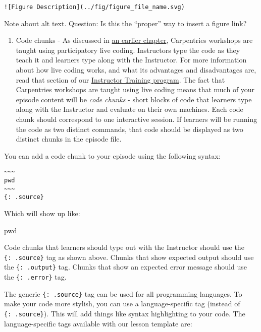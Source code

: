 \documentclass[
]{book}
\newenvironment{Shaded}{\begin{snugshade}}{\end{snugshade}}
\newcommand{\BuiltInTok}[1]{#1}
\providecommand{\tightlist}{%
  \setlength{\itemsep}{0pt}\setlength{\parskip}{0pt}}
\begin{document}
\begin{verbatim}
![Figure Description](../fig/figure_file_name.svg)
\end{verbatim}

Note about alt text. Question: Is this the ``proper'' way to insert a figure link?

\begin{enumerate}
\def\labelenumi{\arabic{enumi}.}
\tightlist
\item
  Code chunks - As discussed in \href{https://carpentries.github.io/curriculum-development/developing-content.html}{an earlier chapter}, Carpentries workshops are taught using participatory
  live coding. Instructors
  type the code as they teach it and learners type along with the Instructor. For more information about how
  live coding works, and what its advantages and disadvantages are, read that section of our
  \href{https://carpentries.github.io/instructor-training/14-live/index.html}{Instructor Training program}. The fact
  that Carpentries workshops are taught using live coding means that much of your episode content will be
  \emph{code chunks} - short blocks of code that learners type along with the Instructor and evaluate on their own
  machines. Each code chunk should correspond to one interactive session. If learners will be
  running the code as two distinct commands, that code should be displayed as two distinct chunks in the episode
  file.
\end{enumerate}

You can add a code chunk to your episode using the following syntax:

\begin{verbatim}
~~~
pwd
~~~
{: .source}
\end{verbatim}

Which will show up like:

\begin{Shaded}
\begin{Highlighting}[]
\BuiltInTok{pwd}
\end{Highlighting}
\end{Shaded}

Code chunks that learners should type out with the Instructor should use the \texttt{\{:\ .source\}} tag as shown above.
Chunks that show expected output should use the \texttt{\{:\ .output\}} tag. Chunks that show an expected error
message should use the \texttt{\{:\ .error\}} tag.

The generic \texttt{\{:\ .source\}} tag can be used for all programming languages. To make your code more stylish,
you can use a language-specific tag (instead of \texttt{\{:\ .source\}}). This will add things like syntax highlighting
to your code. The language-specific tags available with our lesson template are:
\end{document}
